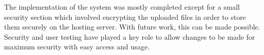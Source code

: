 \documentclass[../main.tex]{subfiles}
\begin{document}
\raggedright
The implementation of the system was mostly completed except for a small security section which involved encrypting the uploaded files in order to store them securely on the hosting server. With future work, this can be made possible. Security and user testing have played a key role to allow changes to be made for maximum security with easy access and usage. 
\end{document}
